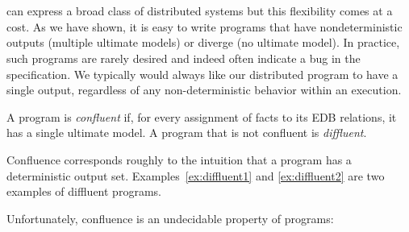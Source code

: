 \section{\slang}
\label{sec:confluence}

\lang can express a broad class of distributed systems but this flexibility comes at a cost.
As we have shown, it is easy to write programs that have nondeterministic
outputs (multiple ultimate models) or diverge (no ultimate model).   In practice, such programs are rarely 
desired and indeed often indicate a bug in the specification.
We typically would always like our distributed program to have a single output, regardless of any non-deterministic behavior within an execution.

\begin{definition}
  A \lang program is {\em confluent} if, for every assignment of facts to its EDB
  relations, it has a single ultimate model.  A program that is not confluent is
  {\em diffluent}.
\end{definition}

Confluence corresponds roughly to the intuition that a program has a
deterministic output set. Examples~\ref{ex:diffluent1} and \ref{ex:diffluent2}
are two examples of diffluent programs.

Unfortunately, confluence is an undecidable property of \lang programs:

